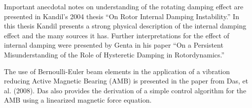 Important anecdotal notes on understanding of the rotating damping effect are presented in Kandil's 2004\cite{kandil2005rotor} thesis ``On Rotor Internal Damping Instability.'' In this thesis Kandil presents a strong physical description of the internal damping effect and the many sources it has. Further interpretations for the effect of internal damping were presented by Genta in his paper ``On a Persistent Misunderstanding of the Role of
Hysteretic Damping in Rotordynamics.''\par 
The use of Bernoulli-Euler beam elements in the application of a vibration reducing Active Magnetic Bearing (AMB) is presented in the paper from Das, et al. (2008\cite{das2008vibration}). Das also provides the derivation of a simple control algorithm for the AMB using a linearized magnetic force equation.\par